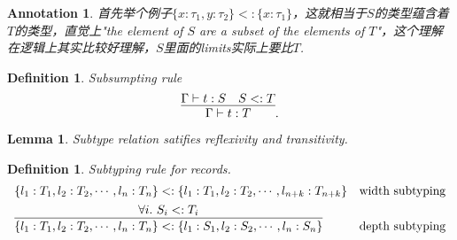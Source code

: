 \documentclass{article}
\theoremstyle{plain}
\newtheorem{lemma}[theorem]{Lemma}
\newtheorem{definition}[theorem]{Definition}
\newtheorem{annotation}[theorem]{Annotation}
\theoremstyle{nonumberplain}
\newcommand{\termtype}[2]{\ensuremath{#1:#2}}
\newcommand{\subtyp}[2]{#1<:#2}
\begin{document}
\begin{annotation}
\rm 首先举个例子$\subtyp{\{x:\tau_1, y:\tau_2\} }{\{x:\tau_1\}}$，这就相当于$S$的类型蕴含着$T$的类型，直觉上"the element of $S$ are a subset of the elements of $T$"，这个理解在逻辑上其实比较好理解，$S$里面的limits实际上要比$T$. 
\end{annotation}

\begin{definition}
\rm Subsumpting rule
$$
\infer{\Gamma \vdash \termtype{t}{T}}{\Gamma \vdash \termtype{t}{S} & \subtyp{S}{T}}.
$$
\end{definition}

\begin{lemma}
\rm Subtype relation satifies reflexivity and transitivity. 
\end{lemma}

\begin{definition}
\rm Subtyping rule for records.
$$
\begin{array}{ll}
\subtyp{\{l_1:T_1,l_2:T_2,\cdots,l_n:T_n\}}{\{l_1:T_1,l_2:T_2,\cdots,l_{n+k}:T_{n+k}\}} & \text{width subtyping} \\[0.5em]
\infer{\subtyp{\{l_1:T_1,l_2:T_2,\cdots,l_n:T_n\}}{\{l_1:S_1,l_2:S_2,\cdots,l_{n}:S_{n}\}}}{\forall i.~\subtyp{S_i}{T_i}} & \text{depth subtyping}
\end{array}
$$
\end{definition}
\end{document}
